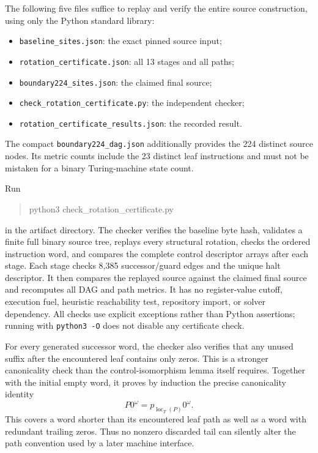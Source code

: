 The following five files suffice to replay and verify the entire source
construction, using only the Python standard library:
\begin{itemize}
\item \texttt{baseline\_sites.json}: the exact pinned source input;
\item \texttt{rotation\_certificate.json}: all 13 stages and all paths;
\item \texttt{boundary224\_sites.json}: the claimed final source;
\item \texttt{check\_rotation\_certificate.py}: the independent checker;
\item \texttt{rotation\_certificate\_results.json}: the recorded result.
\end{itemize}
The compact \texttt{boundary224\_dag.json} additionally provides the 224
distinct source nodes.  Its metric counts include the 23 distinct leaf
instructions and must not be mistaken for a binary Turing-machine state
count.

Run
\begin{quote}\ttfamily
python3 check\_rotation\_certificate.py
\end{quote}
in the artifact directory.  The checker verifies the baseline byte hash,
validates a finite full binary source tree, replays every structural
rotation, checks the ordered instruction word, and compares the complete
control descriptor arrays after each stage.  Each stage checks 8,385
successor/guard edges and the unique halt descriptor.  It then compares
the replayed source against the claimed final source and recomputes all
DAG and path metrics.  It has no register-value cutoff, execution fuel,
heuristic reachability test, repository import, or solver dependency.
All checks use explicit exceptions rather than Python assertions; running
with \texttt{python3 -O} does not disable any certificate check.

For every generated successor word, the checker also verifies that any
unused suffix after the encountered leaf contains only zeros.  This is a
stronger canonicality check than the control-isomorphism lemma itself
requires.  Together with the initial empty word, it proves by induction the precise
canonicality identity
\[ P0^\omega=p_{\operatorname{loc}_T(P)}0^\omega. \]
This covers a word shorter than its encountered leaf path as well as a word
with redundant trailing zeros.  Thus no nonzero discarded tail can silently
alter the path convention used by a later machine interface.

